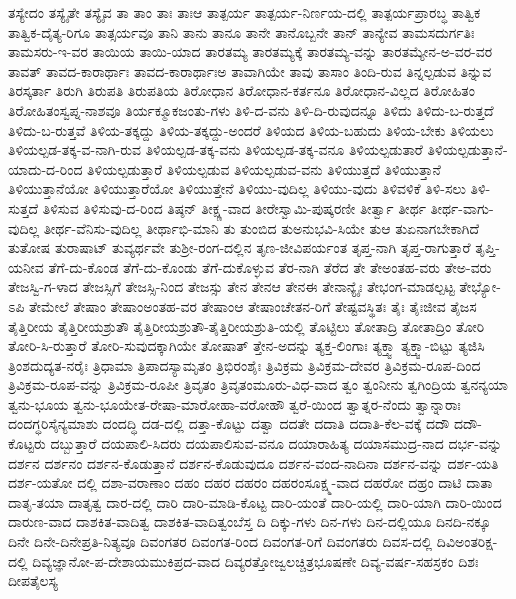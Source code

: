 {ತಸ್ಯೇದಂ
ತಸ್ಯೈತೇ
ತಸ್ಯೈವ
ತಾ
ತಾಂ
ತಾಃ
ತಾಃಆ
ತಾತ್ಪರ್ಯ
ತಾತ್ಪರ್ಯ-ನಿರ್ಣಯ-ದಲ್ಲಿ
ತಾತ್ಪರ್ಯಪ್ರಾರಬ್ಧ
ತಾತ್ವಿಕ
ತಾತ್ವಿಕ-ದೈತ್ಯ-ರಿಗೂ
ತಾತ್ಸರ್ಯವೂ
ತಾನಿ
ತಾನು
ತಾನೂ
ತಾನೇ
ತಾನೊಬ್ಬನೇ
ತಾನ್
ತಾನ್ಯೇವ
ತಾಮಸದುರ್ಗತಿಃ
ತಾಮಸರು-ಇ-ವರ
ತಾಯಿಯ
ತಾಯಿ-ಯಾದ
ತಾರತಮ್ಯ
ತಾರತಮ್ಯಕ್ಕೆ
ತಾರತಮ್ಯ-ವನ್ನು
ತಾರತಮ್ಯೇನ-ಅ-ವರ-ವರ
ತಾವತ್
ತಾವದ-ಕಾರಾರ್ಥಾಃ
ತಾವದ-ಕಾರಾರ್ಥಾಃಅ
ತಾವಾಗಿಯೇ
ತಾವು
ತಾಸಾಂ
ತಿಂದಿ-ರುವ
ತಿನ್ನಲ್ಪಡುವ
ತಿನ್ನುವ
ತಿರಸ್ಕರ್ತಾ
ತಿರುಗಿ
ತಿರುಪತಿ
ತಿರುಪತಿಯ
ತಿರೋಧಾನ
ತಿರೋಧಾನ-ಕರ್ತನೂ
ತಿರೋಧಾನ-ವಿಲ್ಲದ
ತಿರೋಹಿತಂ
ತಿರೋಹಿತಂಸ್ವಪ್ನ-ನಾಶವೂ
ತಿರ್ಯಕ್ಮೂಕಜಂತು-ಗಳು
ತಿಳಿ-ದ-ವನು
ತಿಳಿ-ದಿ-ರುವುದನ್ನೂ
ತಿಳಿದು
ತಿಳಿದು-ಬ-ರುತ್ತದೆ
ತಿಳಿದು-ಬ-ರುತ್ತವೆ
ತಿಳಿಯ-ತಕ್ಕದ್ದು
ತಿಳಿಯ-ತಕ್ಕದ್ದು-ಅಂದರೆ
ತಿಳಿಯದ
ತಿಳಿಯ-ಬಹುದು
ತಿಳಿಯ-ಬೇಕು
ತಿಳಿಯಲು
ತಿಳಿಯಲ್ಪಡ-ತಕ್ಕ-ವ-ನಾಗಿ-ರುವ
ತಿಳಿಯಲ್ಪಡ-ತಕ್ಕ-ವನು
ತಿಳಿಯಲ್ಪಡ-ತಕ್ಕ-ವನೂ
ತಿಳಿಯಲ್ಪಡುತಾರೆ
ತಿಳಿಯಲ್ಪಡುತ್ತಾನೆ-ಯಾದು-ದ-ರಿಂದ
ತಿಳಿಯಲ್ಪಡುತ್ತಾರೆ
ತಿಳಿಯಲ್ಪಡುವ
ತಿಳಿಯಲ್ಪಡುವ-ವನು
ತಿಳಿಯುತ್ತದೆ
ತಿಳಿಯುತ್ತಾನೆ
ತಿಳಿಯುತ್ತಾನೆಯೋ
ತಿಳಿಯುತ್ತಾರೆಯೋ
ತಿಳಿಯುತ್ತೇನೆ
ತಿಳಿಯು-ವುದಿಲ್ಲ
ತಿಳಿಯು-ವುದು
ತಿಳಿವಳಿಕೆ
ತಿಳಿ-ಸಲು
ತಿಳಿ-ಸುತ್ತದೆ
ತಿಳಿಸುವ
ತಿಳಿಸುವು-ದ-ರಿಂದ
ತಿಷ್ಠನ್
ತೀಕ್ಷ್ಣ-ವಾದ
ತೀರೇಸ್ವಾಮಿ-ಪುಷ್ಕರಣೀ
ತೀರ್ತ್ವಾ
ತೀರ್ಥ
ತೀರ್ಥ-ವಾಗು-ವುದಿಲ್ಲ
ತೀರ್ಥ-ವೆನಿಸು-ವುದಿಲ್ಲ
ತೀರ್ಥಾಭಿ-ಮಾನಿ
ತು
ತುಂಬಿದ
ತುಅನುಭವಿ-ಸಿಯೇ
ತುಆ
ತುಏನಾಗಬೇಕಾಗಿದೆ
ತುತೋಷ
ತುರಾಷಾಟ್
ತುವ್ಯರ್ಥವೇ
ತುಶ್ರೀ-ರಂಗ-ದಲ್ಲಿನ
ತೃಣ-ಜೀವಿಪರ್ಯಂತ
ತೃಪ್ತ-ನಾಗಿ
ತೃಪ್ತ-ರಾಗುತ್ತಾರೆ
ತೃಪ್ತಿ-ಯನೀವ
ತೆಗೆ-ದು-ಕೊಂಡ
ತೆಗೆ-ದು-ಕೊಂಡು
ತೆಗೆ-ದುಕೊಳ್ಳುವ
ತೆರ-ನಾಗಿ
ತೆರೆದ
ತೇ
ತೇಅಂತಹ-ವರು
ತೇಅ-ವರು
ತೇಜಸ್ವಿ-ಗ-ಳಾದ
ತೇಜಸ್ಸಿಗೆ
ತೇಜಸ್ಸಿ-ನಿಂದ
ತೇಜಸ್ಸು
ತೇನ
ತೇನಆ
ತೇನಈ
ತೇನಾನ್ಯೈಃ
ತೇಭಂಗ-ಮಾಡಲ್ಪಟ್ಟ
ತೇಭ್ಯೋ-ಽಪಿ
ತೇಮೇಲೆ
ತೇಷಾಂ
ತೇಷಾಂಅಂತಹ-ವರ
ತೇಷಾಂಆ
ತೇಷಾಂಚೇತನ-ರಿಗೆ
ತೇಷ್ಟವಸ್ಥಿತಃ
ತೈಃ
ತೈಃಜೀವ
ತೈಜಸ
ತೈತ್ತಿರೀಯ
ತೈತ್ತಿರೀಯಶ್ರುತೌ
ತೈತ್ತಿರೀಯಶ್ರುತೌ-ತೈತ್ತಿರೀಯಶ್ರುತಿ-ಯಲ್ಲಿ
ತೊಟ್ಟಿಲು
ತೋತಾದ್ರಿ
ತೋತಾದ್ರಿಂ
ತೋರಿ
ತೋರಿ-ಸಿ-ರುತ್ತಾರೆ
ತೋರಿ-ಸುವುದಕ್ಕಾಗಿಯೇ
ತೋಷಾತ್
ತ್ತೇನ-ಅದನ್ನು
ತ್ಯಕ್ತ-ಲಿಂಗಾಃ
ತ್ಯಕ್ತ್ವಾ
ತ್ಯಕ್ತ್ವಾ-ಬಿಟ್ಟು
ತ್ಯಜಿಸಿ
ತ್ರಿಂಶದುದ್ಯತ-ನರೈಃ
ತ್ರಿಧಾಮಾ
ತ್ರಿಪಾದಸ್ಯಾಮೃತಂ
ತ್ರಿಭಿರಂಶೈಃ
ತ್ರಿವಿಕ್ರಮ
ತ್ರಿವಿಕ್ರಮ-ದೇವರ
ತ್ರಿವಿಕ್ರಮ-ರೂಪ-ದಿಂದ
ತ್ರಿವಿಕ್ರಮ-ರೂಪ-ವನ್ನು
ತ್ರಿವಿಕ್ರಮ-ರೂಪೀ
ತ್ರಿವೃತಂ
ತ್ರಿವೃತಂಮೂರು-ವಿಧ-ವಾದ
ತ್ವಂ
ತ್ವಂನೀನು
ತ್ವಗಿಂದ್ರಿಯ
ತ್ವನನ್ಯಯಾ
ತ್ವನು-ಭೂಯ
ತ್ವನು-ಭೂಯೇತ-ರೇಷಾ-ಮಾರೋಹಾ-ವರೋಹೌ
ತ್ವರೆ-ಯಿಂದ
ತ್ವಾತ್ನರ-ನೆಂದು
ತ್ವಾನ್ನಾರಾಃ
ದಂದಗ್ಧರಿಸೈನ್ಯಮಾಶು
ದಂದದ್ಧಿ
ದಡ-ದಲ್ಲಿ
ದತ್ತಾ-ಕೊಟ್ಟು
ದತ್ವಾ
ದದತೇ
ದದಾತಿ
ದದಾತಿ-ಕೆಲ-ವಕ್ಕೆ
ದದೌ
ದದೌ-ಕೊಟ್ಟರು
ದಬ್ಬುತ್ತಾರೆ
ದಯಪಾಲಿ-ಸಿದರು
ದಯಪಾಲಿಸುವ-ವನೂ
ದಯಾರಾಹಿತ್ಯ
ದಯಾಸಮುದ್ರ-ನಾದ
ದರ್ಭ-ವನ್ನು
ದರ್ಶನ
ದರ್ಶನಂ
ದರ್ಶನ-ಕೊಡುತ್ತಾನೆ
ದರ್ಶನ-ಕೊಡುವುದೂ
ದರ್ಶನ-ವಂದ-ನಾದಿನಾ
ದರ್ಶನ-ವನ್ನು
ದರ್ಶ-ಯತಿ
ದರ್ಶ-ಯತೋ
ದಲ್ಲಿ
ದಶಾ-ವರಾಣಾಂ
ದಹಂ
ದಹರ
ದಹರಂ
ದಹರಂಸೂಕ್ಷ್ಮ-ವಾದ
ದಹರೋ
ದಹ್ರಂ
ದಾಟಿ
ದಾತಾ
ದಾತೃ-ತಯಾ
ದಾತೃತ್ವ
ದಾರ-ದಲ್ಲಿ
ದಾರಿ
ದಾರಿ-ಮಾಡಿ-ಕೊಟ್ಟ
ದಾರಿ-ಯಂತೆ
ದಾರಿ-ಯಲ್ಲಿ
ದಾರಿ-ಯಾಗಿ
ದಾರಿ-ಯಿಂದ
ದಾರುಣ-ವಾದ
ದಾಶಕಿತ-ವಾದಿತ್ವ
ದಾಶಕಿತ-ವಾದಿತ್ವಂಬೆಸ್ತ
ದಿ
ದಿಕ್ಕು-ಗಳು
ದಿನ-ಗಳು
ದಿನ-ದಲ್ಲಿಯೂ
ದಿನದಿ-ನಕ್ಕೂ
ದಿನೇ
ದಿನೇ-ದಿನೇಪ್ರತಿ-ನಿತ್ಯವೂ
ದಿವಂಗತರ
ದಿವಂಗತ-ರಿಂದ
ದಿವಂಗತ-ರಿಗೆ
ದಿವಂಗತರು
ದಿವಸ-ದಲ್ಲಿ
ದಿವಿಅಂತರಿಕ್ಷ-ದಲ್ಲಿ
ದಿವ್ಯಜ್ಞಾನೋ-ಪ-ದೇಶಾಯಮುಕಿಪ್ರದ-ವಾದ
ದಿವ್ಯರತ್ತೋಜ್ವಲಚ್ಚಿತ್ರಭೂಷಣೇ
ದಿವ್ಯ-ವರ್ಷ-ಸಹಸ್ರಕಂ
ದಿಶಃ
ದೀಪತೈಲಸ್ಯ
}
